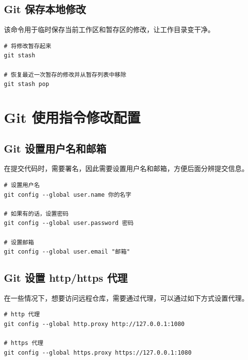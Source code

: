 \documentclass[UTF8]{gyh}
\begin{document}
\subsection{Git 保存本地修改}
该命令用于临时保存当前工作区和暂存区的修改，让工作目录变干净。
\begin{lstlisting}
# 将修改暂存起来
git stash

# 恢复最近一次暂存的修改并从暂存列表中移除
git stash pop
\end{lstlisting}

\section{Git 使用指令修改配置}

\subsection{Git 设置用户名和邮箱}
在提交代码时，需要署名，因此需要设置用户名和邮箱，方便后面分辨提交信息。
\begin{lstlisting}
# 设置用户名
git config --global user.name 你的名字

# 如果有的话，设置密码
git config --global user.password 密码

# 设置邮箱
git config --global user.email "邮箱"
\end{lstlisting}

\subsection{Git 设置 http/https 代理}
在一些情况下，想要访问远程仓库，需要通过代理，可以通过如下方式设置代理。
\begin{lstlisting}
# http 代理
git config --global http.proxy http://127.0.0.1:1080

# https 代理
git config --global https.proxy https://127.0.0.1:1080
\end{lstlisting}
\end{document}

